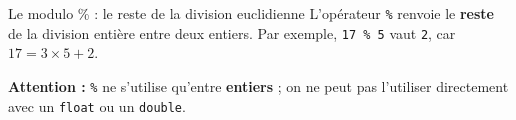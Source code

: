 \begin{UPSTIinfor}{Le modulo \% : le reste de la division euclidienne}
    \label{info:modulo}
    L'opérateur \texttt{\%} renvoie le \textbf{reste} de la division entière entre deux entiers. Par exemple, \verb|17 % 5| vaut \verb|2|, car $17 = 3\times5+2$.

    \textbf{Attention :} \texttt{\%} ne s'utilise qu'entre \textbf{entiers} ; on ne peut pas l'utiliser directement avec un \texttt{float} ou un \texttt{double}.
\end{UPSTIinfor}
